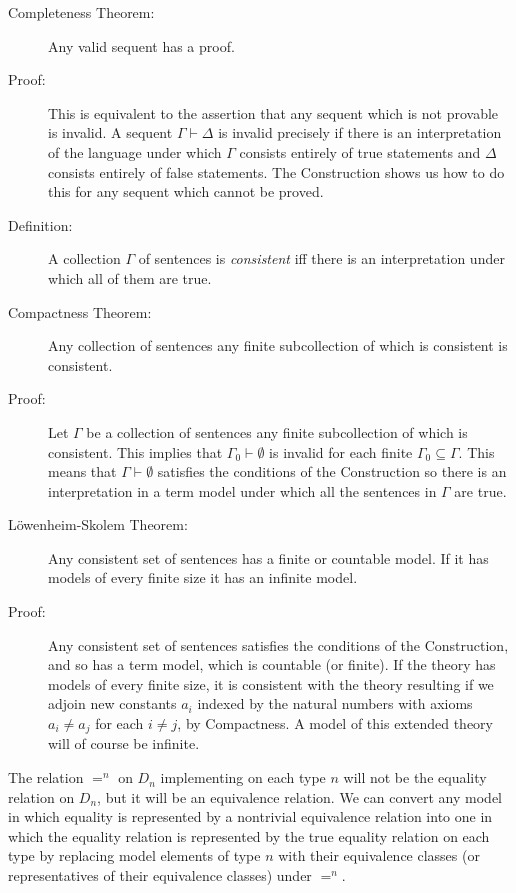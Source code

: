 \documentclass[12pt]{book}
\begin{document}
\begin{description}

\item[Completeness Theorem:]  Any valid sequent has a proof.

\item[Proof:] This is equivalent to the assertion that any sequent
which is not provable is invalid.  A sequent $\Gamma\vdash\Delta$ is
invalid precisely if there is an interpretation of the language under
which $\Gamma$ consists entirely of true statements and $\Delta$
consists entirely of false statements.  The Construction shows us how
to do this for any sequent which cannot be proved.

\item[Definition:] A collection $\Gamma$ of sentences is {\em
consistent\/} iff there is an interpretation under which all of them
are true.

\item[Compactness Theorem:] Any collection of sentences any finite
subcollection of which is consistent is consistent.

\item[Proof:] Let $\Gamma$ be a collection of sentences any finite
subcollection of which is consistent.  This implies that
$\Gamma_0\vdash \emptyset$ is invalid for each finite $\Gamma_0
\subseteq \Gamma$.  This means that $\Gamma\vdash \emptyset$
satisfies the conditions of the Construction so there is an
interpretation in a term model under which all the sentences in
$\Gamma$ are true.

\item[L\"owenheim-Skolem Theorem:] Any consistent set of sentences has
a finite or countable model.  If it has models of every finite size it
has an infinite model.

\item[Proof:] Any consistent set of sentences satisfies the conditions
of the Construction, and so has a term model, which is countable (or
finite).  If the theory has models of every finite size, it is
consistent with the theory resulting if we adjoin new constants $a_i$
indexed by the natural numbers with axioms $a_i \neq a_j$ for each $i
\neq j$, by Compactness.  A model of this extended theory will of
course be infinite.

\end{description}

The relation $=^n$ on $D_n$ implementing on each type $n$ will not be
the equality relation on $D_n$, but it will be an equivalence
relation.  We can convert any model in which equality is represented
by a nontrivial equivalence relation into one in which the equality
relation is represented by the true equality relation on each type by
replacing model elements of type $n$ with their equivalence classes
(or representatives of their equivalence classes) under $=^n$.
\end{document}
